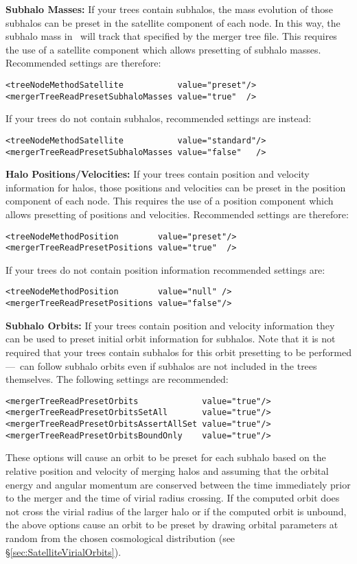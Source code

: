 {\normalfont \bfseries Subhalo Masses:} If your trees contain subhalos, the mass evolution of those subhalos can be preset in the satellite component of each \gls{node}. In this way, the subhalo mass in \glc\ will track that specified by the merger tree file. This requires the use of a satellite component which allows presetting of subhalo masses. Recommended settings are therefore:
\begin{verbatim}
<treeNodeMethodSatellite           value="preset"/>
<mergerTreeReadPresetSubhaloMasses value="true"  />
\end{verbatim}
If your trees do not contain subhalos, recommended settings are instead:
\begin{verbatim}
<treeNodeMethodSatellite           value="standard"/>
<mergerTreeReadPresetSubhaloMasses value="false"   />
\end{verbatim}

{\normalfont \bfseries Halo Positions/Velocities:} If your trees contain position and velocity information for halos, those positions and velocities can be preset in the position component of each \gls{node}. This requires the use of a position component which allows presetting of positions and velocities. Recommended settings are therefore:
\begin{verbatim}
<treeNodeMethodPosition        value="preset"/>
<mergerTreeReadPresetPositions value="true"  />
\end{verbatim}
If your trees do not contain position information recommended settings are:
\begin{verbatim}
<treeNodeMethodPosition        value="null" />
<mergerTreeReadPresetPositions value="false"/>
\end{verbatim}

{\normalfont \bfseries Subhalo Orbits:} If your trees contain position and velocity information they can be used to preset initial orbit information for subhalos. Note that it is not required that your trees contain subhalos for this orbit presetting to be performed---\glc\ can follow subhalo orbits even if subhalos are not included in the trees themselves. The following settings are recommended:
\begin{verbatim}
<mergerTreeReadPresetOrbits             value="true"/>
<mergerTreeReadPresetOrbitsSetAll       value="true"/>
<mergerTreeReadPresetOrbitsAssertAllSet value="true"/>
<mergerTreeReadPresetOrbitsBoundOnly    value="true"/>
\end{verbatim}
These options will cause an orbit to be preset for each subhalo based on the relative position and velocity of merging halos and assuming that the orbital energy and angular momentum are conserved between the time immediately prior to the merger and the time of virial radius crossing. If the computed orbit does not cross the virial radius of the larger halo or if the computed orbit is unbound, the above options cause an orbit to be preset by drawing orbital parameters at random from the chosen cosmological distribution (see \S\ref{sec:SatelliteVirialOrbits}).

